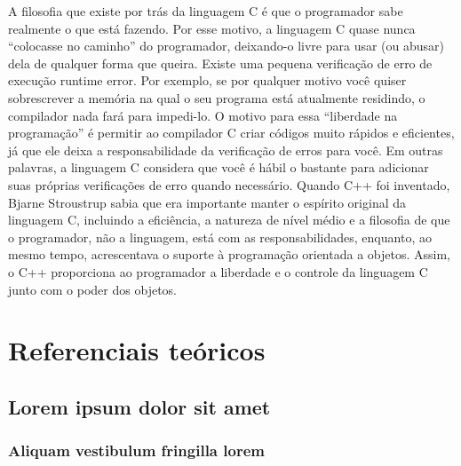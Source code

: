 \documentclass[
    12pt,               %
    openright,          %
    twoside,            %
    a4paper,            %
    brazil              %
    ]{abntex2}
\begin{document}
A filosofia que existe por trás da linguagem C é que o programador sabe realmente o que está fazendo. 
Por esse motivo, a linguagem C quase nunca “colocasse no caminho” do programador, deixando-o livre 
para usar (ou abusar) dela de qualquer forma que queira. Existe uma pequena verificação de erro de 
execução runtime error. Por exemplo, se por qualquer motivo você quiser sobrescrever a memória na qual 
o seu programa está atualmente residindo, o compilador nada fará para impedi-lo. O motivo para essa 
“liberdade na programação” é permitir ao compilador C criar códigos muito rápidos e eficientes, já 
que ele deixa a responsabilidade da verificação de erros para você. Em outras palavras, a linguagem C 
considera que você é hábil o bastante para adicionar suas próprias verificações de erro quando necessário. 
Quando C++ foi inventado, Bjarne Stroustrup sabia que era importante manter o espírito original da 
linguagem C, incluindo a eficiência, a natureza de nível médio e a filosofia de que o programador, 
não a linguagem, está com as responsabilidades, enquanto, ao mesmo tempo, acrescentava o suporte à 
programação orientada a objetos. Assim, o C++ proporciona ao programador a liberdade e o controle da 
linguagem C junto com o poder dos objetos.



\part{Referenciais teóricos}

\chapter{Lorem ipsum dolor sit amet}

\section{Aliquam vestibulum fringilla lorem}

\lipsum[1]

\lipsum[2-3]

\end{document}

